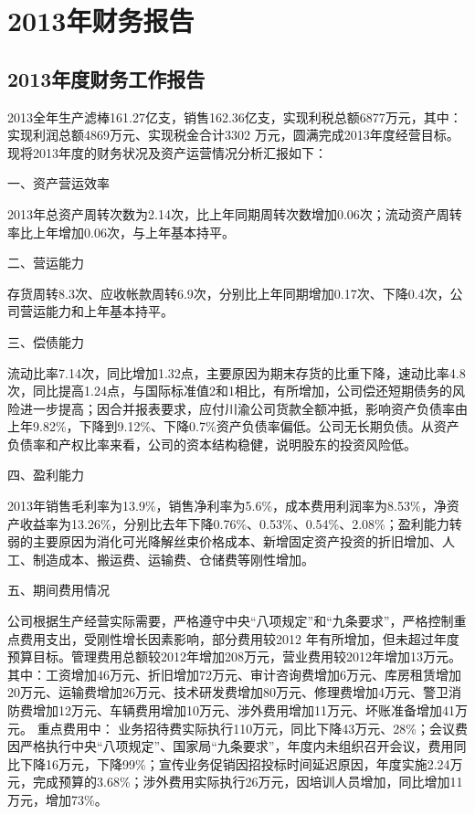 ﻿\chapter{2013年财务报告}
\section{2013年度财务工作报告}

\indent
2013全年生产滤棒161.27亿支，销售162.36亿支，实现利税总额6877万元，其中：实现利润总额4869万元、实现税金合计3302 万元，圆满完成2013年度经营目标。现将2013年度的财务状况及资产运营情况分析汇报如下：

一、资产营运效率

2013年总资产周转次数为2.14次，比上年同期周转次数增加0.06次；流动资产周转率比上年增加0.06次，与上年基本持平。

二、营运能力

存货周转8.3次、应收帐款周转6.9次，分别比上年同期增加0.17次、下降0.4次，公司营运能力和上年基本持平。


三、偿债能力

流动比率7.14次，同比增加1.32点，主要原因为期末存货的比重下降，速动比率4.8次，同比提高1.24点，与国际标准值2和1相比，有所增加，公司偿还短期债务的风险进一步提高；因合并报表要求，应付川渝公司货款全额冲抵，影响资产负债率由上年9.82\%，下降到9.12\%、下降0.7\%资产负债率偏低。公司无长期负债。从资产负债率和产权比率来看，公司的资本结构稳健，说明股东的投资风险低。


四、盈利能力

    2013年销售毛利率为13.9\%，销售净利率为5.6\%，成本费用利润率为8.53\%，净资产收益率为13.26\%，分别比去年下降0.76\%、0.53\%、0.54\%、2.08\%；盈利能力转弱的主要原因为消化可光降解丝束价格成本、新增固定资产投资的折旧增加、人工、制造成本、搬运费、运输费、仓储费等刚性增加。


五、期间费用情况

公司根据生产经营实际需要，严格遵守中央“八项规定”和“九条要求”，严格控制重点费用支出，受刚性增长因素影响，部分费用较2012 年有所增加，但未超过年度预算目标。管理费用总额较2012年增加208万元，营业费用较2012年增加13万元。其中：工资增加46万元、折旧增加72万元、审计咨询费增加6万元、库房租赁增加20万元、运输费增加26万元、技术研发费增加80万元、修理费增加4万元、警卫消防费增加12万元、车辆费用增加10万元、涉外费用增加11万元、坏账准备增加41万元。
重点费用中：
业务招待费实际执行110万元，同比下降43万元、28\%；会议费因严格执行中央“八项规定”、国家局“九条要求”，年度内未组织召开会议，费用同比下降16万元，下降99\%；宣传业务促销因招投标时间延迟原因，年度实施2.24万元，完成预算的3.68\%；涉外费用实际执行26万元，因培训人员增加，同比增加11万元，增加73\%。


